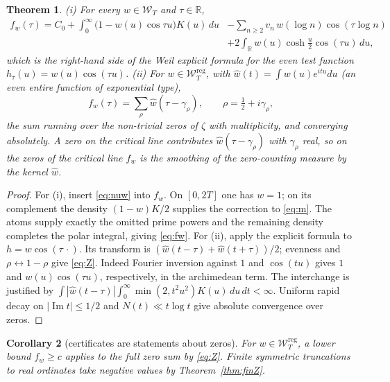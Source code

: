 \documentclass[10pt]{amsart}
\newtheorem{theorem}{Theorem}[section]
\newtheorem{corollary}[theorem]{Corollary}
\theoremstyle{definition}
\theoremstyle{remark}
\newcommand{\R}{\mathbb R}
\newcommand{\Iml}{\operatorname{Im}}
\newcommand{\wh}{\widehat w}
\newcommand{\Wcl}{\mathcal W_T}
\begin{document}
\begin{theorem}\label{thm:Z}
\emph{(i)} For every $w\in\Wcl$ and $\tau\in\R$,
\begin{equation}\label{eq:fw}
\begin{split}
f_w(\tau)=C_0+\int_0^\infty\big(1-w(u)\cos\tau u\big)K(u)\,du&-\sum_{n\ge2}v_n\,w(\log n)\cos(\tau\log n)\\
&+2\int_\R w(u)\cosh\tfrac u2\cos(\tau u)\,du,
\end{split}
\end{equation}
which is the right-hand side of the Weil explicit formula for the even test function
$h_\tau(u)=w(u)\cos(\tau u)$.
\emph{(ii)} For $w\in\Wcl^{\mathrm{reg}}$, with $\wh(t)=\int w(u)e^{itu}du$ (an even entire function
of exponential type),
\begin{equation}\label{eq:Z}
f_w(\tau)=\sum_\rho\wh(\tau-\gamma_\rho),\qquad\rho=\tfrac12+i\gamma_\rho,
\end{equation}
the sum running over the non-trivial zeros of $\zeta$ with multiplicity, and converging absolutely.
A zero on the critical line contributes $\wh(\tau-\gamma_\rho)$ with $\gamma_\rho$ real, so on
the zeros of the critical line $f_w$ is the smoothing of the zero-counting measure by the kernel $\wh$.
\end{theorem}
\begin{proof}
For (i), insert \eqref{eq:nuw} into $f_w$. On $[0,2T]$ one has $w=1$;
on its complement the density $(1-w)K/2$ supplies the correction to
\eqref{eq:m}. The atoms supply exactly the omitted prime powers and the
remaining density completes the polar integral, giving \eqref{eq:fw}.
For (ii), apply the explicit formula \cite{Weil52,IK}
to $h=w\cos(\tau\,\cdot)$. Its transform is
$(\wh(t-\tau)+\wh(t+\tau))/2$; evenness and $\rho\leftrightarrow1-\rho$
give \eqref{eq:Z}. Indeed Fourier inversion against $1$ and $\cos(tu)$
gives $1$ and $w(u)\cos(\tau u)$, respectively, in the archimedean
term. The interchange is justified by
$\int|\wh(t-\tau)|\int_0^\infty\min(2,t^2u^2)K(u)\,du\,dt<\infty$.
Uniform rapid decay on $|\Iml t|\le1/2$ and $N(t)\ll t\log t$
give absolute convergence over zeros.
\end{proof}


\begin{corollary}[certificates are statements about zeros]\label{cor:zeros}
For $w\in\Wcl^{\mathrm{reg}}$, a lower bound $f_w\ge c$ applies
to the full zero sum by \eqref{eq:Z}. Finite symmetric truncations
to real ordinates take negative values by Theorem~\ref{thm:finZ}.
\end{corollary}
\end{document}
